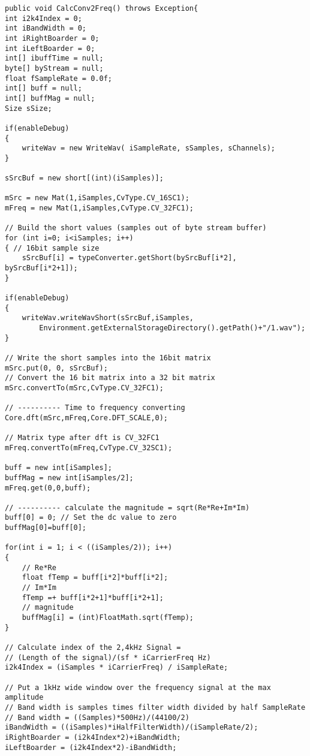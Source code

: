 \documentclass[10pt]{article}
\begin{document}
\begin{lstlisting}
public void CalcConv2Freq() throws Exception{
int i2k4Index = 0;
int iBandWidth = 0;
int iRightBoarder = 0;
int iLeftBoarder = 0;
int[] ibuffTime = null;
byte[] byStream = null;
float fSampleRate = 0.0f;
int[] buff = null;
int[] buffMag = null;
Size sSize;
		
if(enableDebug)
{
	writeWav = new WriteWav( iSampleRate, sSamples, sChannels);
}
				
sSrcBuf = new short[(int)(iSamples)];      		
		
mSrc = new Mat(1,iSamples,CvType.CV_16SC1);    
mFreq = new Mat(1,iSamples,CvType.CV_32FC1);   
							
// Build the short values (samples out of byte stream buffer)
for (int i=0; i<iSamples; i++)
{ // 16bit sample size
	sSrcBuf[i] = typeConverter.getShort(bySrcBuf[i*2], bySrcBuf[i*2+1]);
}
		
if(enableDebug)
{		
	writeWav.writeWavShort(sSrcBuf,iSamples,
		Environment.getExternalStorageDirectory().getPath()+"/1.wav");
}
				
// Write the short samples into the 16bit matrix
mSrc.put(0, 0, sSrcBuf);
// Convert the 16 bit matrix into a 32 bit matrix 
mSrc.convertTo(mSrc,CvType.CV_32FC1);
		
// ---------- Time to frequency converting 
Core.dft(mSrc,mFreq,Core.DFT_SCALE,0);

// Matrix type after dft is CV_32FC1 
mFreq.convertTo(mFreq,CvType.CV_32SC1);

buff = new int[iSamples];
buffMag = new int[iSamples/2];
mFreq.get(0,0,buff);

// ---------- calculate the magnitude = sqrt(Re*Re+Im*Im)
buff[0] = 0; // Set the dc value to zero
buffMag[0]=buff[0];
		
for(int i = 1; i < ((iSamples/2)); i++)
{
	// Re*Re
	float fTemp = buff[i*2]*buff[i*2];
	// Im*Im
	fTemp =+ buff[i*2+1]*buff[i*2+1];
	// magnitude 
	buffMag[i] = (int)FloatMath.sqrt(fTemp);
}
		
// Calculate index of the 2,4kHz Signal =
// (Length of the signal)/(sf * iCarrierFreq Hz) 
i2k4Index = (iSamples * iCarrierFreq) / iSampleRate;
					
// Put a 1kHz wide window over the frequency signal at the max amplitude 
// Band width is samples times filter width divided by half SampleRate 
// Band width = ((Samples)*500Hz)/(44100/2)
iBandWidth = ((iSamples)*iHalfFilterWidth)/(iSampleRate/2);
iRightBoarder = (i2k4Index*2)+iBandWidth;
iLeftBoarder = (i2k4Index*2)-iBandWidth;
		

\end{lstlisting}
\end{document}

